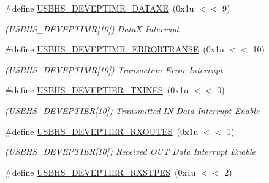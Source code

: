 \begin{DoxyCompactItemize}
\#define \mbox{\hyperlink{group__SAMS70__USBHS_gaf3e4e1efe7661d24c3cb60e370824a04}{U\+S\+B\+H\+S\+\_\+\+D\+E\+V\+E\+P\+T\+I\+M\+R\+\_\+\+D\+A\+T\+A\+XE}}~(0x1u $<$$<$ 9)
\begin{DoxyCompactList}\small\item\em (U\+S\+B\+H\+S\+\_\+\+D\+E\+V\+E\+P\+T\+I\+MR\mbox{[}10\mbox{]}) DataX Interrupt \end{DoxyCompactList}\item 
\mbox{\label{group__SAMS70__USBHS_ga39d2bc9137a99d759e889e72b20d5784}} 
\#define \mbox{\hyperlink{group__SAMS70__USBHS_ga39d2bc9137a99d759e889e72b20d5784}{U\+S\+B\+H\+S\+\_\+\+D\+E\+V\+E\+P\+T\+I\+M\+R\+\_\+\+E\+R\+R\+O\+R\+T\+R\+A\+N\+SE}}~(0x1u $<$$<$ 10)
\begin{DoxyCompactList}\small\item\em (U\+S\+B\+H\+S\+\_\+\+D\+E\+V\+E\+P\+T\+I\+MR\mbox{[}10\mbox{]}) Transaction Error Interrupt \end{DoxyCompactList}\item 
\mbox{\label{group__SAMS70__USBHS_gadaf4a6b6fc4cd4f3ccb9f038c0dd961c}} 
\#define \mbox{\hyperlink{group__SAMS70__USBHS_gadaf4a6b6fc4cd4f3ccb9f038c0dd961c}{U\+S\+B\+H\+S\+\_\+\+D\+E\+V\+E\+P\+T\+I\+E\+R\+\_\+\+T\+X\+I\+N\+ES}}~(0x1u $<$$<$ 0)
\begin{DoxyCompactList}\small\item\em (U\+S\+B\+H\+S\+\_\+\+D\+E\+V\+E\+P\+T\+I\+ER\mbox{[}10\mbox{]}) Transmitted IN Data Interrupt Enable \end{DoxyCompactList}\item 
\mbox{\label{group__SAMS70__USBHS_ga4c5b287a879e1d4f9a02bbe5a17c8114}} 
\#define \mbox{\hyperlink{group__SAMS70__USBHS_ga4c5b287a879e1d4f9a02bbe5a17c8114}{U\+S\+B\+H\+S\+\_\+\+D\+E\+V\+E\+P\+T\+I\+E\+R\+\_\+\+R\+X\+O\+U\+T\+ES}}~(0x1u $<$$<$ 1)
\begin{DoxyCompactList}\small\item\em (U\+S\+B\+H\+S\+\_\+\+D\+E\+V\+E\+P\+T\+I\+ER\mbox{[}10\mbox{]}) Received O\+UT Data Interrupt Enable \end{DoxyCompactList}\item 
\mbox{\label{group__SAMS70__USBHS_ga5a663a7ed6edeebe0935d7497d01b728}} 
\#define \mbox{\hyperlink{group__SAMS70__USBHS_ga5a663a7ed6edeebe0935d7497d01b728}{U\+S\+B\+H\+S\+\_\+\+D\+E\+V\+E\+P\+T\+I\+E\+R\+\_\+\+R\+X\+S\+T\+P\+ES}}~(0x1u $<$$<$ 2)
$$
\end{DoxyCompactItemize}
